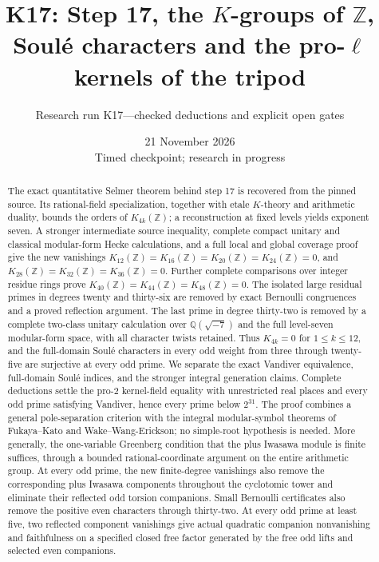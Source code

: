\documentclass[11pt,a4paper]{article}
\title{K17: Step 17, the $K$-groups of $\mathbb Z$,\\
Soul\'e characters and the pro-$\ell$ kernels of the tripod}
\author{Research run K17---checked deductions and explicit open gates}
\date{21 November 2026\\Timed checkpoint; research in progress}
\theoremstyle{definition}
\begin{document}
\maketitle
\begin{abstract}
The exact quantitative Selmer theorem behind step 17 is recovered from
the pinned source. Its rational-field specialization, together with
etale $K$-theory and arithmetic duality, bounds the orders of
$K_{4k}(\mathbb Z)$; a reconstruction at fixed levels yields exponent
seven. A stronger intermediate source inequality, complete compact
unitary and classical modular-form Hecke calculations, and a full local
and global coverage proof give the new vanishings
$K_{12}(\mathbb Z)=K_{16}(\mathbb Z)=K_{20}(\mathbb Z)=K_{24}(\mathbb Z)=0$,
and $K_{28}(\mathbb Z)=K_{32}(\mathbb Z)=K_{36}(\mathbb Z)=0$.
Further complete comparisons over integer residue rings prove
$K_{40}(\mathbb Z)=K_{44}(\mathbb Z)=K_{48}(\mathbb Z)=0$.
The isolated large residual primes in degrees twenty and thirty-six
are removed by exact Bernoulli congruences and a proved reflection argument.
The last prime in degree thirty-two is removed by a complete two-class
unitary calculation over $\mathbb Q(\sqrt{-7})$ and the full level-seven
modular-form space, with all character twists retained. Thus $K_{4k}=0$
for $1\leq k\leq12$, and the full-domain Soul\'e characters in every odd
weight from three through twenty-five are surjective at every odd prime.
We separate the exact Vandiver equivalence, full-domain Soul\'e
indices, and the stronger integral generation claims. Complete
deductions settle the pro-$2$ kernel-field equality with unrestricted
real places and every odd prime satisfying Vandiver, hence every
prime below $2^{31}$. The proof combines a general pole-separation
criterion with the integral modular-symbol theorems of Fukaya--Kato
and Wake--Wang-Erickson; no simple-root hypothesis is needed. More generally, the one-variable Greenberg
condition that the plus Iwasawa module is finite suffices, through a
bounded rational-coordinate argument on the entire arithmetic group. At every
odd prime, the new finite-degree vanishings also remove the corresponding
plus Iwasawa components throughout the cyclotomic tower and eliminate
their reflected odd torsion companions. Small Bernoulli certificates
also remove the positive even characters through thirty-two. At every
odd prime at least five, two reflected component vanishings give actual
quadratic companion nonvanishing and faithfulness on a specified closed
free factor generated by the free odd lifts and selected even companions.

\end{abstract}
\end{document}
